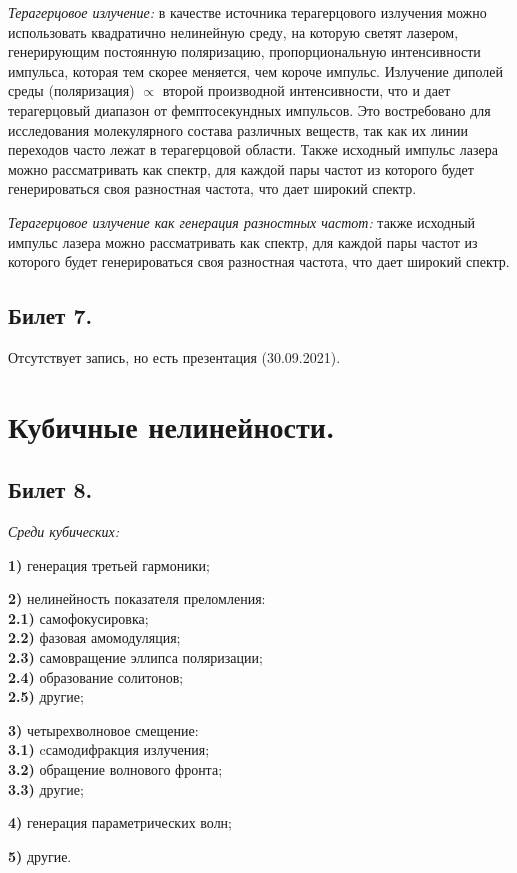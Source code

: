 \documentclass[a4paper,12pt]{article}
\theoremstyle{definition} %
\theoremstyle{definition} %
\theoremstyle{remark} %
\begin{document}
	\textit{Терагерцовое излучение:} в качестве источника терагерцового излучения можно использовать квадратично нелинейную среду, на которую светят лазером, генерирующим постоянную поляризацию, пропорциональную интенсивности импульса, которая тем скорее меняется, чем короче импульс. Излучение диполей среды (поляризация) $\propto$ второй производной интенсивности, что и дает терагерцовый диапазон от фемптосекундных импульсов. Это востребовано для исследования молекулярного состава различных веществ, так как их линии переходов часто лежат в терагерцовой области. Также исходный импульс лазера можно рассматривать как спектр, для каждой пары частот из которого будет генерироваться своя разностная частота, что дает широкий спектр.


	\textit{Терагерцовое излучение как генерация разностных частот:} также исходный импульс лазера можно рассматривать как спектр, для каждой пары частот из которого будет генерироваться своя разностная частота, что дает широкий спектр.


\subsection{Билет 7.}

Отсутствует запись, но есть презентация (30.09.2021).

\section{Кубичные нелинейности.}
\subsection{Билет 8.}


	\textit{Среди кубических:}\\
	\par \textbf{1)} генерация третьей гармоники; \\
	\par \textbf{2)} нелинейность показателя преломления: \\
	 \textbf{2.1)} самофокусировка; \\
	 \textbf{2.2)} фазовая амомодуляция; \\
 	 \textbf{2.3)} самовращение эллипса поляризации; \\
	 \textbf{2.4)} образование солитонов; \\
	 \textbf{2.5)} другие; \\
	\par \textbf{3)} четырехволновое смещение: \\
	 \textbf{3.1)} cсамодифракция излучения; \\
	 \textbf{3.2)} обращение волнового фронта; \\
	 \textbf{3.3)} другие; \\
	\par \textbf{4)} генерация параметрических волн; \\
	\par \textbf{5)} другие.
\end{document}

